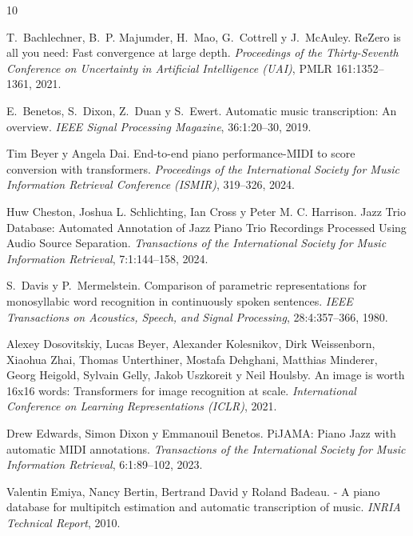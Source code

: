 \documentclass[11pt,spanish,listoffigures,listoftables]{tfgetsinf}
\begin{document}
\begin{thebibliography}{10}

T.~Bachlechner, B.~P. Majumder, H.~Mao, G.~Cottrell y J.~McAuley.
\newblock ReZero is all you need: Fast convergence at large depth.
\newblock \textit{Proceedings of the Thirty-Seventh Conference on Uncertainty in Artificial Intelligence (UAI)}, PMLR 161:1352--1361, 2021.

E.~Benetos, S.~Dixon, Z.~Duan y S.~Ewert.
\newblock Automatic music transcription: An overview.
\newblock \textit{IEEE Signal Processing Magazine}, 36:1:20--30, 2019.

Tim Beyer y Angela Dai.
\newblock End-to-end piano performance-{MIDI} to score conversion with transformers.
\newblock \textit{Proceedings of the International Society for Music Information Retrieval Conference (ISMIR)}, 319--326, 2024.

Huw Cheston, Joshua L. Schlichting, Ian Cross y Peter M. C. Harrison.
\newblock Jazz Trio Database: Automated Annotation of Jazz Piano Trio Recordings Processed Using Audio Source Separation.
\newblock \textit{Transactions of the International Society for Music Information Retrieval}, 7:1:144--158, 2024.

S.~Davis y P.~Mermelstein.
\newblock Comparison of parametric representations for monosyllabic word recognition in continuously spoken sentences.
\newblock \textit{IEEE Transactions on Acoustics, Speech, and Signal Processing}, 28:4:357--366, 1980.

Alexey Dosovitskiy, Lucas Beyer, Alexander Kolesnikov, Dirk Weissenborn, Xiaohua Zhai, Thomas Unterthiner, Mostafa Dehghani, Matthias Minderer, Georg Heigold, Sylvain Gelly, Jakob Uszkoreit y Neil Houlsby.
\newblock An image is worth 16x16 words: Transformers for image recognition at scale.
\newblock \textit{International Conference on Learning Representations (ICLR)}, 2021.

Drew Edwards, Simon Dixon y Emmanouil Benetos.
\newblock PiJAMA: Piano Jazz with automatic MIDI annotations.
\newblock \textit{Transactions of the International Society for Music Information Retrieval}, 6:1:89--102, 2023.

Valentin Emiya, Nancy Bertin, Bertrand David y Roland Badeau.
 - A piano database for multipitch estimation and automatic transcription of music.
\newblock \textit{INRIA Technical Report}, 2010.


\end{thebibliography}
\end{document}
